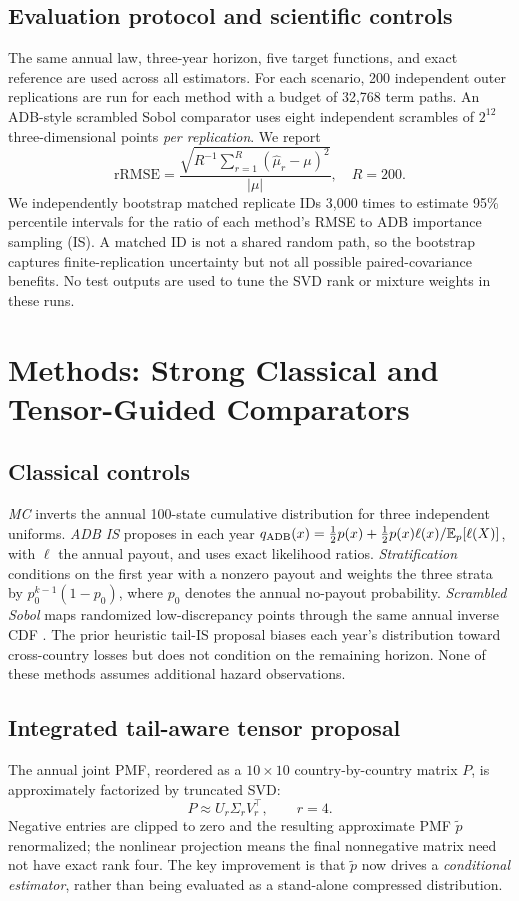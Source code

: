 \documentclass[10pt,conference]{IEEEtran}
\newcommand{\EE}{\mathbb{E}}
\newcommand{\rrmse}{\mathrm{rRMSE}}
\begin{document}
\subsection{Evaluation protocol and scientific controls}
The same annual law, three-year horizon, five target functions, and exact reference are used across all estimators. For each scenario, 200 independent outer replications are run for each method with a budget of 32,768 term paths. An ADB-style scrambled Sobol comparator uses eight independent scrambles of $2^{12}$ three-dimensional points \emph{per replication}. We report
\begin{equation}
\rrmse=\frac{\sqrt{R^{-1}\sum_{r=1}^{R}(\hat\mu_r-\mu)^2}}{|\mu|},\quad R=200.
\label{eq:rmse}
\end{equation}
We independently bootstrap matched replicate IDs 3,000 times to estimate 95\% percentile intervals for the ratio of each method's RMSE to ADB importance sampling (IS). A matched ID is not a shared random path, so the bootstrap captures finite-replication uncertainty but not all possible paired-covariance benefits. No test outputs are used to tune the SVD rank or mixture weights in these runs.

\section{Methods: Strong Classical and Tensor-Guided Comparators}
\subsection{Classical controls}
\emph{MC} inverts the annual 100-state cumulative distribution for three independent uniforms. \emph{ADB IS} proposes in each year $q_{\rm ADB}(x)=\frac12 p(x)+\frac12p(x)\ell(x)/\EE_p[\ell(X)]$, with $\ell$ the annual payout, and uses exact likelihood ratios. \emph{Stratification} conditions on the first year with a nonzero payout and weights the three strata by $p_0^{k-1}(1-p_0)$, where $p_0$ denotes the annual no-payout probability. \emph{Scrambled Sobol} maps randomized low-discrepancy points through the same annual inverse CDF \cite{owen}. The prior heuristic tail-IS proposal biases each year's distribution toward cross-country losses but does not condition on the remaining horizon. None of these methods assumes additional hazard observations.

\subsection{Integrated tail-aware tensor proposal}
The annual joint PMF, reordered as a $10\times10$ country-by-country matrix $P$, is approximately factorized by truncated SVD:
\begin{equation}
P\approx U_r\Sigma_rV_r^{\top},\qquad r=4.
\end{equation}
Negative entries are clipped to zero and the resulting approximate PMF $\tilde p$ renormalized; the nonlinear projection means the final nonnegative matrix need not have exact rank four. The key improvement is that $\tilde p$ now drives a \emph{conditional estimator}, rather than being evaluated as a stand-alone compressed distribution.
\end{document}

